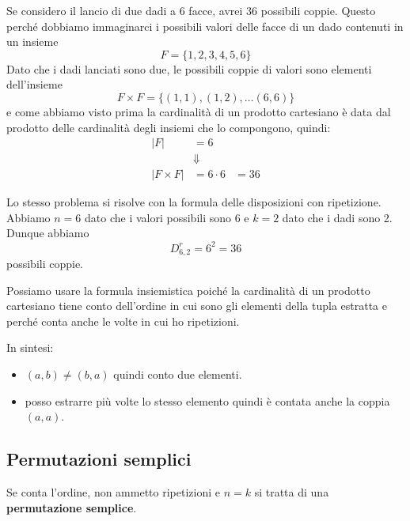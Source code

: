 \begin{example}
	Se considero il lancio di due dadi a 6 facce, avrei 36 possibili coppie. Questo perch\'e
	dobbiamo immaginarci i possibili valori delle facce di un dado contenuti in un insieme
	\begin{equation*}
		F = \{ 1, 2, 3, 4, 5, 6 \}
	\end{equation*}
	Dato che i dadi lanciati sono due, le possibili coppie di valori sono elementi dell'insieme
	\begin{equation*}
		F \times F = \{ (1, 1), (1, 2), \dots (6, 6) \}
	\end{equation*}
	e come abbiamo visto prima la cardinalit\`a di un prodotto cartesiano \`e data dal prodotto
	delle cardinalit\`a degli insiemi che lo compongono, quindi:
	\begin{equation*}
		\begin{array}{lll}
			|F|          & = 6                \\
			             & \Downarrow         \\
			|F \times F| & = 6 \cdot 6 & = 36
		\end{array}
	\end{equation*}

	Lo stesso problema si risolve con la formula delle disposizioni con ripetizione. Abbiamo
	$n = 6$ dato che i valori possibili sono 6 e $k = 2$ dato che i dadi sono 2. Dunque abbiamo
	\begin{equation*}
		D_{6, 2}^r = 6^2 = 36
	\end{equation*}
	possibili coppie.
\end{example}

\begin{observation}
	Possiamo usare la formula insiemistica poich\'e la cardinalit\`a di un prodotto cartesiano
	tiene conto dell'ordine in cui sono gli elementi della tupla estratta e perch\'e conta
	anche le volte in cui ho ripetizioni.

	In sintesi:
	\begin{itemize}
		\item $(a, b) \neq (b, a)$ quindi conto due elementi.
		\item posso estrarre pi\`u volte lo stesso elemento quindi \`e contata anche la
		      coppia $(a, a)$.
	\end{itemize}

\end{observation}


\subsection{Permutazioni semplici}
\begin{defn}
	Se conta l'ordine, non ammetto ripetizioni e $n = k$ si tratta di una
	\textbf{permutazione semplice}.
\end{defn}

